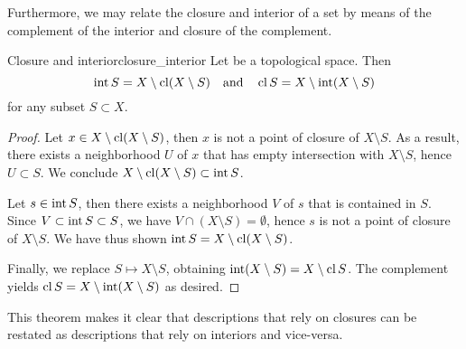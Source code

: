 Furthermore, we may relate the closure and interior of a set by means of the complement of the interior and closure of the complement.
\begin{theorem}{Closure and interior}{closure_interior}
    Let  be a topological space. Then
    \begin{equation*}
        \operatorname{int} S = X \setminus \operatorname{cl}(X \setminus S)\quad\text{and}\quad \operatorname{cl}{S} = X \setminus \operatorname{int}(X \setminus S)
    \end{equation*}
    for any subset \(S \subset X\).
\end{theorem}
\begin{proof}
    Let \(x \in X\setminus\operatorname{cl}(X\setminus S)\), then \(x\) is not a point of closure of \(X \setminus S\). As a result, there exists a neighborhood \(U\) of \(x\) that has empty intersection with \(X \setminus S\), hence \(U \subset S\). We conclude \(X\setminus\operatorname{cl}(X \setminus S) \subset \operatorname{int} S\).

    Let \(s \in \operatorname{int} S\), then there exists a neighborhood \(V\) of \(s\) that is contained in \(S\). Since \(V \subset \operatorname{int} S \subset S\), we have \(V \cap (X \setminus S) = \emptyset\), hence \(s\) is not a point of closure of \(X \setminus S\). We have thus shown \(\operatorname{int} S = X \setminus \operatorname{cl}(X \setminus S)\).

    Finally, we replace \(S \mapsto X \setminus S\), obtaining \(\operatorname{int}(X\setminus S) = X \setminus \operatorname{cl} S\). The complement yields \(\operatorname{cl}{S} = X \setminus \operatorname{int}(X\setminus S)\) as desired.
\end{proof}
\begin{remark}
    This theorem makes it clear that descriptions that rely on closures can be restated as descriptions that rely on interiors and vice-versa.
\end{remark}

